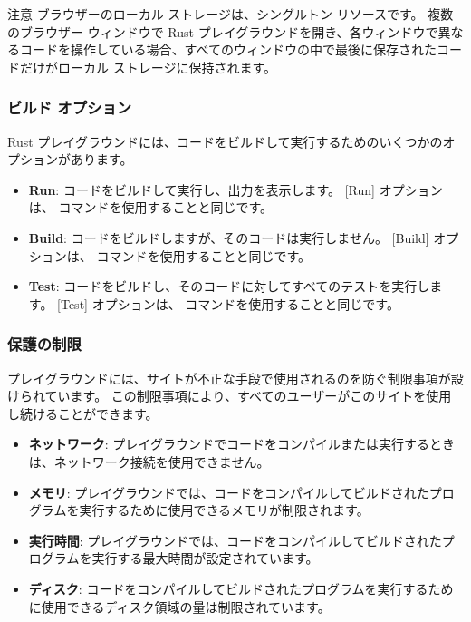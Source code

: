 \begin{itembox}[l]{注意}
ブラウザーのローカル ストレージは、シングルトン リソースです。 複数のブラウザー ウィンドウで Rust プレイグラウンドを開き、各ウィンドウで異なるコードを操作している場合、すべてのウィンドウの中で最後に保存されたコードだけがローカル ストレージに保持されます。
\end{itembox}

\subsubsection{ビルド オプション}

Rust プレイグラウンドには、コードをビルドして実行するためのいくつかのオプションがあります。

\begin{itemize}
\item \textbf{Run}: コードをビルドして実行し、出力を表示します。 [Run] オプションは、 コマンドを使用することと同じです。
\item \textbf{Build}: コードをビルドしますが、そのコードは実行しません。 [Build] オプションは、 コマンドを使用することと同じです。
\item \textbf{Test}: コードをビルドし、そのコードに対してすべてのテストを実行します。 [Test] オプションは、 コマンドを使用することと同じです。
\end{itemize}

\subsubsection{保護の制限}

プレイグラウンドには、サイトが不正な手段で使用されるのを防ぐ制限事項が設けられています。 この制限事項により、すべてのユーザーがこのサイトを使用し続けることができます。

\begin{itemize}
\item \textbf{ネットワーク}: プレイグラウンドでコードをコンパイルまたは実行するときは、ネットワーク接続を使用できません。
\item \textbf{メモリ}: プレイグラウンドでは、コードをコンパイルしてビルドされたプログラムを実行するために使用できるメモリが制限されます。
\item \textbf{実行時間}: プレイグラウンドでは、コードをコンパイルしてビルドされたプログラムを実行する最大時間が設定されています。
\item \textbf{ディスク}: コードをコンパイルしてビルドされたプログラムを実行するために使用できるディスク領域の量は制限されています。
\end{itemize}




